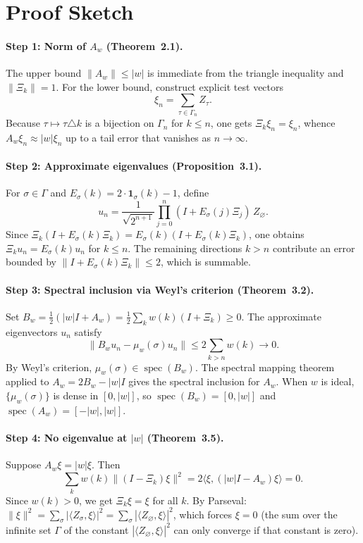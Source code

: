 \documentclass[11pt,a4paper]{article}
\begin{document}
\section{Proof Sketch}

\paragraph{Step 1: Norm of $A_w$ (Theorem~2.1).}
The upper bound $\|A_w\|\le|w|$ is immediate from the triangle inequality and $\|\Xi_k\|=1$. For the lower bound, construct explicit test vectors
\[
  \xi_n = \sum_{\tau\in\Gamma_n} Z_\tau.
\]
Because $\tau\mapsto\tau\triangle k$ is a bijection on $\Gamma_n$ for $k\le n$, one gets $\Xi_k\xi_n=\xi_n$, whence $A_w\xi_n\approx |w|\xi_n$ up to a tail error that vanishes as $n\to\infty$.

\paragraph{Step 2: Approximate eigenvalues (Proposition~3.1).}
For $\sigma\in\Gamma$ and $E_\sigma(k)=2\cdot\mathbf{1}_\sigma(k)-1$, define
\[
  u_n = \frac{1}{\sqrt{2^{n+1}}}\prod_{j=0}^{n}(I+E_\sigma(j)\Xi_j)\,Z_\varnothing.
\]
Since $\Xi_k(I+E_\sigma(k)\Xi_k)=E_\sigma(k)(I+E_\sigma(k)\Xi_k)$, one obtains $\Xi_k u_n = E_\sigma(k)u_n$ for $k\le n$. The remaining directions $k>n$ contribute an error bounded by $\|I+E_\sigma(k)\Xi_k\|\le 2$, which is summable.

\paragraph{Step 3: Spectral inclusion via Weyl's criterion (Theorem~3.2).}
Set $B_w=\tfrac12(|w|I+A_w)=\tfrac12\sum_k w(k)(I+\Xi_k)\ge 0$. The approximate eigenvectors $u_n$ satisfy
\[
  \|B_w u_n - \mu_w(\sigma)u_n\| \le 2\sum_{k>n}w(k)\to 0.
\]
By Weyl's criterion, $\mu_w(\sigma)\in\operatorname{spec}(B_w)$. The spectral mapping theorem applied to $A_w=2B_w-|w|I$ gives the spectral inclusion for $A_w$. When $w$ is ideal, $\{\mu_w(\sigma)\}$ is dense in $[0,|w|]$, so $\operatorname{spec}(B_w)=[0,|w|]$ and $\operatorname{spec}(A_w)=[-|w|,|w|]$.

\paragraph{Step 4: No eigenvalue at $|w|$ (Theorem~3.5).}
Suppose $A_w\xi=|w|\xi$. Then
\[
  \sum_k w(k)\|(I-\Xi_k)\xi\|^2 = 2\langle\xi,(|w|I-A_w)\xi\rangle = 0.
\]
Since $w(k)>0$, we get $\Xi_k\xi=\xi$ for all $k$. By Parseval:
$\|\xi\|^2=\sum_\sigma|\langle Z_\sigma,\xi\rangle|^2 = \sum_\sigma|\langle Z_\varnothing,\xi\rangle|^2$,
which forces $\xi=0$ (the sum over the infinite set $\Gamma$ of the constant $|\langle Z_\varnothing,\xi\rangle|^2$ can only converge if that constant is zero).
\end{document}
